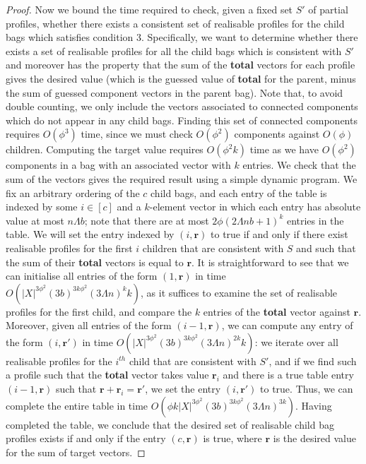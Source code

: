 \documentclass[a4paper,UKenglish,cleveref, autoref, thm-restate]{lipics-v2021} %
\begin{document}
\begin{proof}
    Now we bound the time required to check, given a fixed set $S'$ of partial profiles, whether there exists a consistent set of realisable profiles for the child bags which satisfies condition 3.  Specifically, we want to determine whether there exists a set of realisable profiles for all the child bags which is consistent with $S'$ and moreover has the property that the sum of the \textbf{total} vectors for each profile gives the desired value (which is the guessed value of \textbf{total} for the parent, minus the sum of guessed component vectors in the parent bag). Note that, to avoid double counting, we only include the vectors associated to connected components which do not appear in any child bags. Finding this set of connected components requires $O(\phi^3)$ time, since we must check $O(\phi^2)$ components against $O(\phi)$ children. Computing the target value requires $O(\phi^2k)$ time as we have $O(\phi^2)$ components in a bag with an associated vector with $k$ entries. We check that the sum of the vectors gives the required result using a simple dynamic program.  We fix an arbitrary ordering of the $c$ child bags, and each entry of the table is indexed by some $i \in [c]$ and a $k$-element vector in which each entry has absolute value at most $n \Lambda b$; note that there are at most $2 \phi (2 \Lambda n b + 1)^k$ entries in the table.  We will set the entry indexed by $(i,\mathbf{r})$ to true if and only if there exist realisable profiles for the first $i$ children that are consistent with $S$ and such that the sum of their \textbf{total} vectors is equal to $\mathbf{r}$.  It is straightforward to see that we can initialise all entries of the form $(1,\mathbf{r})$ in time $O(|X|^{3 \phi^2} (3b)^{3k\phi^2}(3\Lambda n )^k k)$, as it suffices to examine the set of realisable profiles for the first child, and compare the $k$ entries of the \textbf{total} vector against $\mathbf{r}$.  Moreover, given all entries of the form $(i-1,\mathbf{r})$, we can compute any entry of the form $(i,\mathbf{r}')$ in time $O(|X|^{3 \phi^2} (3b)^{3k\phi^2}(3\Lambda n )^{2k} k)$: we iterate over all realisable profiles for the $i^{th}$ child that are consistent with $S'$, and if we find such a profile such that the \textbf{total} vector takes value $\mathbf{r}_i$ and there is a true table entry $(i-1,\mathbf{r})$ such that $\mathbf{r} + \mathbf{r}_i = \mathbf{r}'$, we set the entry $(i,\mathbf{r}')$ to true.  Thus, we can complete the entire table in time $O(\phi k |X|^{3 \phi^2} (3b)^{3k\phi^2}(3\Lambda n)^{3k})$.  Having completed the table, we conclude that the desired set of realisable child bag profiles exists if and only if the entry $(c,\mathbf{r})$ is true, where $\mathbf{r}$ is the desired value for the sum of target vectors.


\end{proof}
\end{document}
